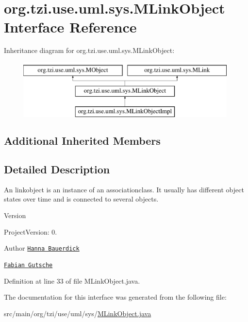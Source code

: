 \hypertarget{interfaceorg_1_1tzi_1_1use_1_1uml_1_1sys_1_1_m_link_object}{\section{org.\-tzi.\-use.\-uml.\-sys.\-M\-Link\-Object Interface Reference}
\label{interfaceorg_1_1tzi_1_1use_1_1uml_1_1sys_1_1_m_link_object}
}
Inheritance diagram for org.\-tzi.\-use.\-uml.\-sys.\-M\-Link\-Object\-:\begin{figure}[H]
\begin{center}
\leavevmode
\includegraphics[height=3.000000cm]{interfaceorg_1_1tzi_1_1use_1_1uml_1_1sys_1_1_m_link_object}
\end{center}
\end{figure}
\subsection*{Additional Inherited Members}


\subsection{Detailed Description}
An linkobject is an instance of an associationclass. It usually has different object states over time and is connected to several objects.

\begin{DoxyVersion}{Version}

\end{DoxyVersion}
\begin{DoxyParagraph}{Project\-Version\-:}
0. 
\end{DoxyParagraph}
\begin{DoxyAuthor}{Author}
\href{mailto:hanna@tzi.de}{\tt Hanna Bauerdick} 

\href{mailto:gutsche@tzi.de}{\tt Fabian Gutsche} 
\end{DoxyAuthor}


Definition at line 33 of file M\-Link\-Object.\-java.



The documentation for this interface was generated from the following file\-:\begin{DoxyCompactItemize}
\item 
src/main/org/tzi/use/uml/sys/\hyperlink{_m_link_object_8java}{M\-Link\-Object.\-java}\end{DoxyCompactItemize}
